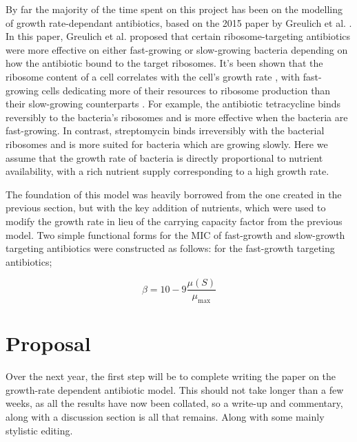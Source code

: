 \documentclass[a4paper,12pt]{article}
\begin{document}
By far the majority of the time spent on this project has been on the modelling of growth rate-dependant antibiotics, based on the 2015 paper by Greulich et al. 
\cite{bioref:Greulich-growthDependentAntibiotics}.  In this paper, Greulich et al. proposed that certain ribosome-targeting antibiotics were more effective on either 
fast-growing or slow-growing bacteria depending on how the antibiotic bound to the target ribosomes.  It's been shown that the ribosome content of a cell correlates with 
the cell's growth rate \cite{bioref:Bremer-ribosome-content-2008}, with fast-growing cells dedicating more of their resources to ribosome production than their slow-growing 
counterparts \cite{bioref:Scott-ribosome-content-2010}.  For example, the antibiotic tetracycline binds reversibly to the bacteria's ribosomes and is more effective when the 
bacteria are fast-growing.  In contrast, streptomycin binds irreversibly with the bacterial ribosomes and is more suited for bacteria which are growing slowly.  Here we 
assume that the growth rate of bacteria is directly proportional to nutrient availability, with a rich nutrient supply corresponding to a high growth rate.


The foundation of this model was heavily borrowed from the one created in the previous section, but with the key addition of nutrients, which were used to modify the 
growth rate in lieu of the carrying capacity factor from the previous model.  Two simple functional forms for the MIC of fast-growth and slow-growth targeting antibiotics 
were constructed as follows: for the fast-growth targeting antibiotics; 

\begin{equation}
 \beta =  10 - 9\frac{\mu(S)}{\mu_{\max}}
\end{equation}




\section{Proposal}



Over the next year, the first step will be to complete writing the paper on the growth-rate dependent antibiotic model.  This should not take longer than a few weeks, as all 
the results have now been collated, so a write-up and commentary, along with a discussion section is all that remains.  Along with some mainly stylistic editing.
\end{document}
